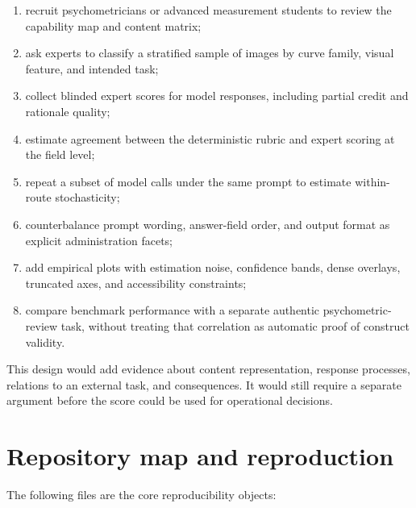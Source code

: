 \documentclass[11pt]{article}
\begin{document}
\begin{enumerate}
\item recruit psychometricians or advanced measurement students to review the capability map and content matrix;
\item ask experts to classify a stratified sample of images by curve family, visual feature, and intended task;
\item collect blinded expert scores for model responses, including partial credit and rationale quality;
\item estimate agreement between the deterministic rubric and expert scoring at the field level;
\item repeat a subset of model calls under the same prompt to estimate within-route stochasticity;
\item counterbalance prompt wording, answer-field order, and output format as explicit administration facets;
\item add empirical plots with estimation noise, confidence bands, dense overlays, truncated axes, and accessibility constraints;
\item compare benchmark performance with a separate authentic psychometric-review task, without treating that correlation as automatic proof of construct validity.
\end{enumerate}

This design would add evidence about content representation, response processes, relations to an external task, and consequences. It would still require a separate argument before the score could be used for operational decisions.

\section{Repository map and reproduction}

The following files are the core reproducibility objects:
\end{document}
